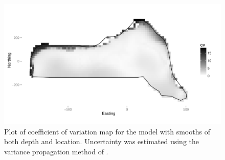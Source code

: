 \documentclass[a4paper,12pt]{article}
\begin{document}
\begin{figure}[h!]
  \caption{Plot of coefficient of variation map for the model with smooths of both depth and location. Uncertainty was estimated using the variance propagation method of \cite{WILLIAMS:2011in}.}
  \label{cv-plot}
  \begin{center}
    \includegraphics[width=\textwidth]{figs/cvplot-varprop}
  \end{center}
\end{figure}

\newpage
\end{document}
